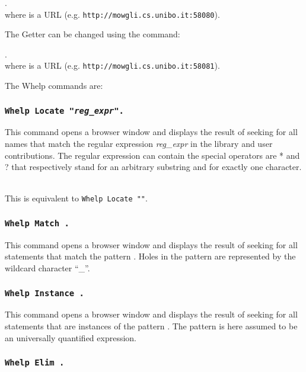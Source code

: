 \smallskip
{}.\\
where {\str} is a URL (e.g. {\tt http://mowgli.cs.unibo.it:58080}).
\smallskip

\noindent The Getter can be changed using the command:
\smallskip

.\\
where {\str} is a URL (e.g. {\tt http://mowgli.cs.unibo.it:58081}).  

\bigskip

The {\sc Whelp} commands are:

\subsubsection{\tt Whelp Locate "{\sl reg\_expr}".
}

This command opens a browser window and displays the result of seeking
for all names that match the regular expression {\sl reg\_expr} in the
{\Coq} library and user contributions. The regular expression can
contain the special operators are * and ? that respectively stand for
an arbitrary substring and for exactly one character.

\\
This is equivalent to {\tt Whelp Locate "{\ident}"}.

\subsubsection{\tt Whelp Match {\pattern}.
}

This command opens a browser window and displays the result of seeking
for all statements that match the pattern {\pattern}. Holes in the
pattern are represented by the wildcard character ``\_''.

\subsubsection[\tt Whelp Instance {\pattern}.]{\tt Whelp Instance {\pattern}.}

This command opens a browser window and displays the result of seeking
for all statements that are instances of the pattern {\pattern}. The
pattern is here assumed to be an universally quantified expression.

\subsubsection[\tt Whelp Elim {\qualid}.]{\tt Whelp Elim {\qualid}.}

